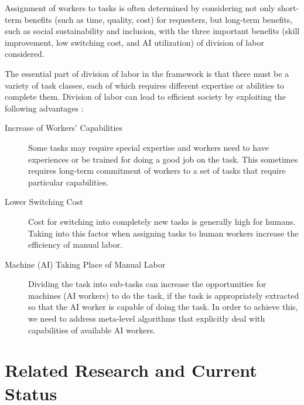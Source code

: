 Assignment of workers to tasks is often determined by  considering not only short-term benefits (such as time, quality, cost) for requesters, but long-term benefits, such as social sustainability and inclusion, with the three important benefits (skill improvement, low switching cost, and AI utilization) of division of labor considered.

The essential part of  division of labor in the framework is that there must be a variety of task classes, each of which requires different expertise or abilities to complete them.
Division of labor can lead to efficient society by exploiting the following advantages \cite{Smi76}:

\begin{description}
\item[Increase of Workers' Capabilities] Some tasks may require special expertise and workers need to have experiences or be trained for doing a good job on the task.
This sometimes requires long-term commitment of workers to a set of tasks that require particular capabilities.

\item[Lower Switching Cost] Cost for switching into completely new tasks  is generally high for humans. Taking into this factor when assigning tasks to human workers  increase the efficiency of manual labor. 

\item[Machine (AI) Taking Place of Manual Labor] Dividing the task into sub-tasks can increase the opportunities for machines (AI workers) to do the task, if the task is appropriately extracted so that the AI worker is capable of doing the task.
In order to achieve this, we need to address  meta-level algorithms that explicitly deal with capabilities of available AI workers.
\end{description}


\section{Related Research and Current Status}
\label{sec:relatedstatus}



